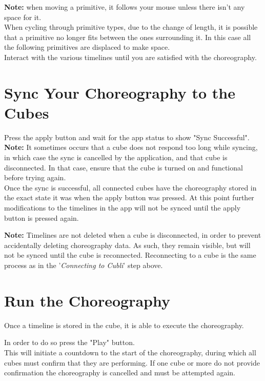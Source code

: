 \textbf{Note:} when moving a primitive, it follows your mouse unless there isn't any space for it.\\

When cycling through primitive types, due to the change of length, it is possible that a primitive no longer fits between the ones surrounding it. In this case all the following primitives are displaced to make space.\\

Interact with the various timelines until you are satisfied with the choreography.


\section{Sync Your Choreography to the Cubes}

Press the apply button and wait for the app status to show "Sync Successful".\\

\textbf{Note:} It sometimes occurs that a cube does not respond too long while syncing, in which case the sync is cancelled by the application, and that cube is disconnected. In that case, ensure that the cube is turned on and functional before trying again.\\

Once the sync is successful, all connected cubes have the choreography stored in the exact state it was when the apply button was pressed. 
At this point further modifications to the timelines in the app will not be synced until the apply button is pressed again.

\textbf{Note:} Timelines are not deleted when a cube is disconnected, in order to prevent accidentally deleting choreography data. As such, they remain visible, but will not be synced until the cube is reconnected. Reconnecting to a cube is the same process as in the '\textit{Connecting to Cubli}' step above.


\section{Run the Choreography}

Once a timeline is stored in the cube, it is able to execute the choreography. 

In order to do so press the "Play" button.\\

This will initiate a countdown to the start of the choreography, during which all cubes must confirm that they are performing. If one cube or more do not provide confirmation the choreography is cancelled and must be attempted again.\\

